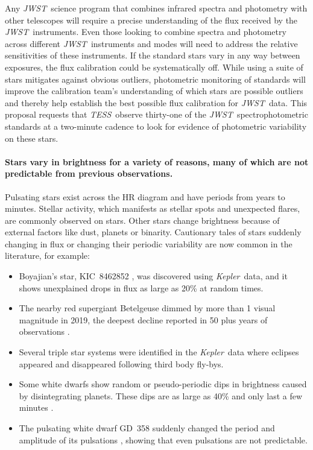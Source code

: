 \documentclass[letterpaper,12pt]{article}
\newcommand{\tess}{{\it TESS}}
\newcommand{\jwst}{{\it JWST}}
\newcommand{\kepler}{{\it Kepler}}
\begin{document}
Any \jwst\ science program that combines infrared spectra and photometry with other telescopes will require a precise understanding of the flux received by the \jwst\ instruments.  Even those looking to combine spectra and photometry across different \jwst\ instruments and modes will need to address the relative sensitivities of these instruments. If the standard stars vary in any way between exposures, the flux calibration could be systematically off. While using a suite of stars mitigates against obvious outliers, photometric monitoring of standards will improve the calibration team's understanding of which stars are possible outliers and thereby help establish the best possible flux calibration for \jwst\ data.  This proposal requests that \tess\ observe thirty-one of the \jwst\ spectrophotometric standards at a two-minute cadence to look for evidence of photometric variability on these stars. 


\vspace{-1em}
\paragraph{Stars vary in brightness for a variety of reasons, many of which are not predictable from previous observations.}
Pulsating stars exist across the HR diagram and have periods from years to minutes. Stellar activity, which manifests as stellar spots \citep{McQuillan2014} and unexpected flares, are commonly observed on stars. Other stars change brightness because of external factors like dust, planets or binarity. Cautionary tales of stars suddenly changing in flux or changing their periodic variability are now common in the literature, for example: 
\begin{itemize}
    \item  Boyajian's star, KIC~8462852 \citep{Boyajian2016}, was discovered using \kepler\ data, and it shows unexplained drops in flux as large as 20\% at random times.
    \item The nearby red supergiant Betelgeuse \citep{Guinan2019} dimmed by more than 1 visual magnitude in 2019, the deepest decline reported in 50 plus years of observations \citep{Levesque2020ApJ}.
    \item Several triple star systems were identified in the \kepler\ data \citep{Orosz2015} where eclipses appeared and disappeared following third body fly-bys. 
    \item Some white dwarfs show random or pseudo-periodic dips in brightness caused by disintegrating planets. These dips are as large as 40\% and only last a few minutes \citep{Vanderburg2015}.
    \item The pulsating white dwarf GD~358 suddenly changed the period and amplitude of its pulsations \citep{Montgomery2010}, showing that even pulsations are not predictable.
\end{itemize}
\end{document}
